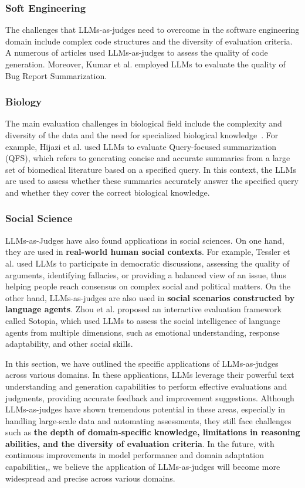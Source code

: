 \subsubsection{Soft Engineering}
\label{sec: Soft Engineering}
The challenges that LLMs-as-judges need to overcome in the software engineering domain include complex code structures and the diversity of evaluation criteria. A numerous of articles \cite{patel2024aime, weyssow2024codeultrafeedback} used LLMs-as-judges to assess the quality of code generation. Moreover, Kumar et al. \cite{kumar2024llms} employed LLMs to evaluate the quality of Bug Report Summarization.

\subsubsection{Biology}
\label{sec: Biology}
The main evaluation challenges in biological field include the complexity and diversity of the data and the need for specialized biological knowledge~\cite{o2023bioplanner,hijazi2024using}. For example, Hijazi et al. \cite{hijazi2024using} used LLMs to evaluate Query-focused summarization (QFS), which refers to generating concise and accurate summaries from a large set of biomedical literature based on a specified query. In this context, the LLMs are used to assess whether these summaries accurately answer the specified query and whether they cover the correct biological knowledge.
\subsubsection{Social Science}
\label{sec: Social Science}
LLMs-as-Judges have also found applications in social sciences. On one hand, they are used in \textbf{real-world human social contexts}. For example, Tessler et al. \cite{tessler2024ai} used LLMs to participate in democratic discussions, assessing the quality of arguments, identifying fallacies, or providing a balanced view of an issue, thus helping people reach consensus on complex social and political matters. On the other hand, LLMs-as-judges are also used in \textbf{social scenarios constructed by language agents}. Zhou et al. \cite{zhou2023sotopia} proposed an interactive evaluation framework called Sotopia, which used LLMs to assess the social intelligence of language agents from multiple dimensions, such as emotional understanding, response adaptability, and other social skills.


In this section, we have outlined the specific applications of LLMs-as-judges across various domains. In these applications, LLMs leverage their powerful text understanding and generation capabilities to perform effective evaluations and judgments, providing accurate feedback and improvement suggestions. Although LLMs-as-judges have shown tremendous potential in these areas, especially in handling large-scale data and automating assessments, they still face challenges such as \textbf{the depth of domain-specific knowledge, limitations in reasoning abilities, and the diversity of evaluation criteria}. In the future, with continuous improvements in model performance and domain adaptation capabilities,, we believe the application of LLMs-as-judges will become more widespread and precise across various domains.

